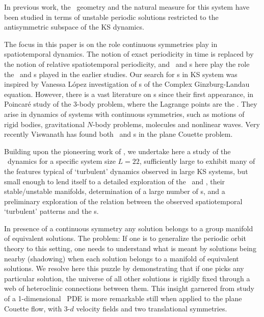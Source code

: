 In previous work, the \statesp\ geometry and the natural measure for
this system have been
studied in terms of unstable
periodic solutions restricted to the antisymmetric subspace of the
KS dynamics.

The focus in this paper is on the role continuous symmetries
play in spatiotemporal dynamics. The notion of exact
periodicity in time is replaced by the notion of relative
spatiotemporal periodicity, and \reqva\ and \rpo s here play
the role the \eqva\ and \po s played in the earlier studies.
Our search for \rpo s in KS system was inspired by Vanessa
L{\'o}pez investigation of {\rpo s} of the
Complex Ginzburg-Landau equation.  However, there is a vast
literature on {\rpo s} since their first appearance, in
Poincar\'e study of the 3-body problem,
where the Lagrange points are the \reqva.  They arise in
dynamics of systems with continuous symmetries, such as
motions of rigid bodies, gravitational $N$-body problems,
molecules and nonlinear waves. Very recently
Viswanath has found both \reqva\ and \rpo s in
the plane Couette problem.

Building upon the pioneering work of ,
we undertake here
a study of the \KS\ dynamics
for a specific system size $L = 22$, sufficiently large
to exhibit many of the features typical of `turbulent' dynamics
observed in large KS systems, but small enough to lend itself to a
detailed exploration of the  \eqva\ and \reqva,
their stable/unstable manifolds,
determination of a large number of
\rpo s, and a preliminary exploration of the relation between the
observed spatiotemporal `turbulent' patterns and the \rpo s.

In presence of a continuous symmetry any solution belongs to a group
manifold of equivalent solutions. The problem: If one is to
generalize the periodic orbit theory to this setting, one needs to
understand what is meant by solutions being nearby (shadowing) when
each solution belongs to a manifold of equivalent solutions. We
resolve here this puzzle by demonstrating that if one picks any
particular solution, the universe of all other solutions is rigidly
fixed through a web of heteroclinic connections between them. This
insight garnered from study of a 1-dimensional \KS\ PDE is more
remarkable still when applied to the plane Couette flow,
with 3-$d$ velocity fields and two translational symmetries.


